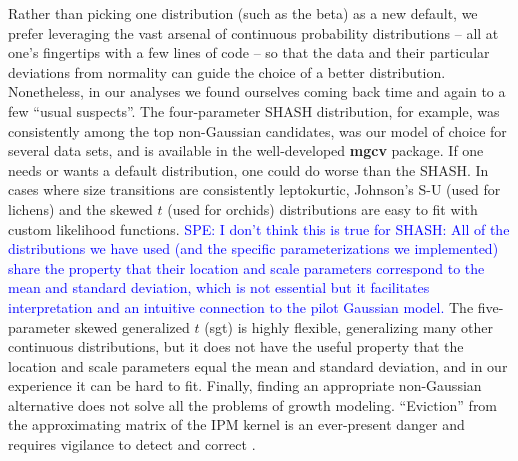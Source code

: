 \documentclass[12pt]{article}
\newcommand{\comment}{\textcolor{blue}}
\begin{document}
Rather than picking one distribution (such as the beta) as a new default, we prefer leveraging the vast arsenal of continuous probability distributions -- all at one's fingertips with a few lines of code -- so that the data and their particular deviations from normality can guide the choice of a better distribution. 
Nonetheless, in our analyses we found ourselves coming back time and again to a few ``usual suspects''. 
The four-parameter SHASH distribution, for example, 
was consistently among the top non-Gaussian candidates, was our model of choice for several data sets, and is available in the well-developed \textbf{mgcv} package. 
If one needs or wants a default distribution, one could do worse than the SHASH. 
In cases where size transitions are consistently leptokurtic, Johnson's S-U (used for lichens) and the skewed $t$ (used for orchids) distributions are easy to fit with custom likelihood functions. 
\comment{SPE: I don't think this is true for SHASH: All of the distributions we have used (and the specific parameterizations we implemented) share the property that their location and scale parameters correspond to the mean and standard deviation, which is not essential but it facilitates interpretation and an intuitive connection to the pilot Gaussian model. } 
The five-parameter skewed generalized $t$ (sgt) is highly flexible, generalizing many other continuous distributions, but it does not have the useful property that the location and scale parameters equal the mean and standard deviation, and in our experience it can be hard to fit. 
Finally, finding an appropriate non-Gaussian alternative does not solve all the problems of growth modeling. 
``Eviction'' from the approximating matrix of the IPM kernel is an ever-present danger and requires vigilance to detect and correct \citep{williams2012avoiding}. 
\end{document}
